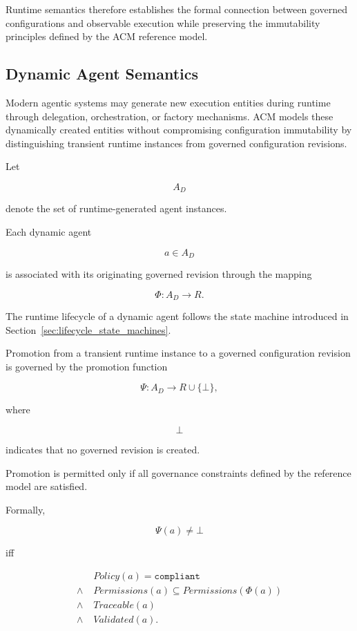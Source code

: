 \documentclass[10pt]{article}
\begin{document}
Runtime semantics therefore establishes the formal connection between governed configurations and observable execution while preserving the immutability principles defined by the ACM reference model.

\subsection{Dynamic Agent Semantics}
\label{sec:dynamic_agents}

Modern agentic systems may generate new execution entities during runtime through delegation, orchestration, or factory mechanisms. ACM models these dynamically created entities without compromising configuration immutability by distinguishing transient runtime instances from governed configuration revisions.

Let

\[
A_D
\]

denote the set of runtime-generated agent instances.

Each dynamic agent

\[
a\in A_D
\]

is associated with its originating governed revision through the mapping

\[
\Phi :
A_D
\rightarrow
R.
\]

The runtime lifecycle of a dynamic agent follows the state machine introduced in Section~\ref{sec:lifecycle_state_machines}.

Promotion from a transient runtime instance to a governed configuration revision is governed by the promotion function

\[
\Psi :
A_D
\rightarrow
R
\cup
\{\bot\},
\]

where

\[
\bot
\]

indicates that no governed revision is created.

Promotion is permitted only if all governance constraints defined by the reference model are satisfied.

Formally,

\[
\Psi(a)\neq\bot
\]

iff

\[
\begin{aligned}
&
Policy(a)=\texttt{compliant}
\\
\land\;&
Permissions(a)\subseteq Permissions(\Phi(a))
\\
\land\;&
Traceable(a)
\\
\land\;&
Validated(a).
\end{aligned}
\]
\end{document}
